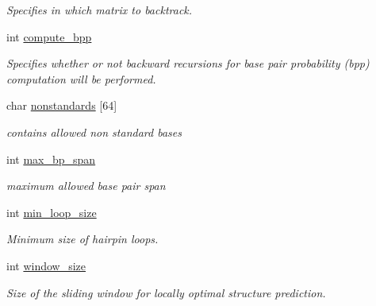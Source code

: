 \begin{DoxyCompactItemize}
\begin{DoxyCompactList}\small\item\em Specifies in which matrix to backtrack. \end{DoxyCompactList}\item 
\mbox{\label{structvrna__md__s_aa0c3e03d9064363e27adcc92b8d0380f}} 
int \mbox{\hyperlink{structvrna__md__s_aa0c3e03d9064363e27adcc92b8d0380f}{compute\+\_\+bpp}}
\begin{DoxyCompactList}\small\item\em Specifies whether or not backward recursions for base pair probability (bpp) computation will be performed. \end{DoxyCompactList}\item 
\mbox{\label{structvrna__md__s_a3fde4ac9eaf972f503c7a76726cefb59}} 
char \mbox{\hyperlink{structvrna__md__s_a3fde4ac9eaf972f503c7a76726cefb59}{nonstandards}} \mbox{[}64\mbox{]}
\begin{DoxyCompactList}\small\item\em contains allowed non standard bases \end{DoxyCompactList}\item 
\mbox{\label{structvrna__md__s_a659e5fcc6e8c9f1a68e7de6548eef3b0}} 
int \mbox{\hyperlink{structvrna__md__s_a659e5fcc6e8c9f1a68e7de6548eef3b0}{max\+\_\+bp\+\_\+span}}
\begin{DoxyCompactList}\small\item\em maximum allowed base pair span \end{DoxyCompactList}\item 
int \mbox{\hyperlink{structvrna__md__s_a9ed7ba42fcc46915c5c0c524f3d255f5}{min\+\_\+loop\+\_\+size}}
\begin{DoxyCompactList}\small\item\em Minimum size of hairpin loops. \end{DoxyCompactList}\item 
\mbox{\label{structvrna__md__s_abea42f9229f8d8d6bcbedef316315bfc}} 
int \mbox{\hyperlink{structvrna__md__s_abea42f9229f8d8d6bcbedef316315bfc}{window\+\_\+size}}
\begin{DoxyCompactList}\small\item\em Size of the sliding window for locally optimal structure prediction. \end{DoxyCompactList}\item 

\end{DoxyCompactItemize}
